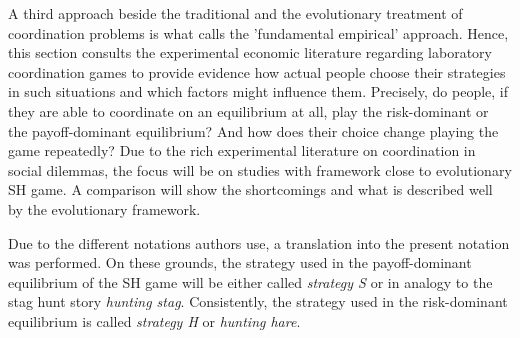 \label{sec:experimentalevidence}
A third approach beside the traditional and the evolutionary treatment of 
coordination problems is what \textcite{camerer_behavioral_2003} calls the 
'fundamental empirical' approach.
Hence, this section consults the experimental economic literature regarding 
laboratory coordination games to provide evidence how actual people choose
their strategies in such situations and which factors might influence them. 
Precisely, do people, if they are able to coordinate on an equilibrium at all,
play the risk-dominant or the payoff-dominant equilibrium? And how does their
choice change playing the game repeatedly?
Due to the rich experimental literature on coordination in social 
dilemmas, the focus will be on studies with framework close to  
evolutionary SH game. A comparison will show the shortcomings and what
is described well by the evolutionary framework.
 
Due to the different notations authors use, a translation into the present
notation was performed.
On these grounds, the 
strategy used in the payoff-dominant equilibrium of the SH game will be 
either called  \textit{strategy S} or in analogy to the stag hunt story 
\textit{hunting stag}.
Consistently, the strategy used in the risk-dominant equilibrium is called
\textit{strategy H} or \textit{hunting hare}.

